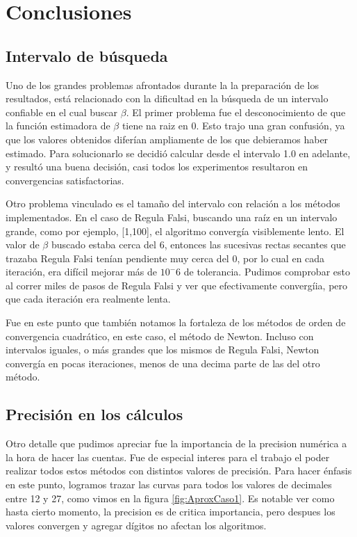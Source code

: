 \section{Conclusiones}

\subsection{Intervalo de b\'usqueda}

Uno de los grandes problemas afrontados durante la la preparaci\'on de los 
resultados, est\'a relacionado con la dificultad en la b\'usqueda de un intervalo
confiable en el cual buscar $\beta$. El primer problema fue el desconocimiento
de que la funci\'on estimadora de $\beta$ tiene na raiz en 0. Esto trajo una
gran confusi\'on, ya que los valores obtenidos difer\'ian ampliamente 
de los que debieramos haber estimado. Para solucionarlo se decidi\'o calcular
desde el intervalo 1.0 en adelante, y result\'o una buena decisi\'on, casi 
todos los experimentos resultaron en convergencias satisfactorias.

Otro problema vinculado es el tama\~no del intervalo con relaci\'on a los 
m\'etodos implementados. 
En el caso de Regula Falsi, buscando una ra\'iz en un intervalo grande, como por 
ejemplo, [1,100], el algoritmo 
converg\'ia visiblemente lento. El valor de $\beta$ buscado estaba cerca 
del 6, entonces las sucesivas rectas secantes que trazaba Regula Falsi ten\'ian 
pendiente muy cerca del 0, por lo cual en cada iteraci\'on, era dif\'icil 
mejorar m\'as de $10^-6$ de tolerancia. Pudimos comprobar esto al 
correr miles de pasos de Regula Falsi y ver que efectivamente converg\'iia, pero
que cada iteraci\'on era realmente lenta.

Fue en este punto que tambi\'en notamos la fortaleza de los m\'etodos de orden de 
convergencia cuadr\'atico, en este caso, el m\'etodo de Newton. 
Incluso con intervalos iguales, o m\'as 
grandes que los mismos de Regula Falsi, Newton converg\'ia en pocas iteraciones, 
menos de una decima parte de las del otro m\'etodo.

\subsection{Precisi\'on en los c\'alculos}

Otro detalle que pudimos apreciar fue la importancia de la precision num\'erica 
a la hora de hacer las cuentas. 
Fue de especial interes para el trabajo el poder realizar todos estos m\'etodos 
con distintos valores 
de precisi\'on. Para hacer \'enfasis en este punto, logramos trazar las curvas 
para todos los valores de decimales 
entre 12 y 27, como vimos en la figura \ref{fig:AproxCaso1}.
Es notable ver como hasta cierto momento, la precision es de critica 
importancia, pero despues los valores convergen y 
agregar d\'igitos no afectan los algoritmos.

